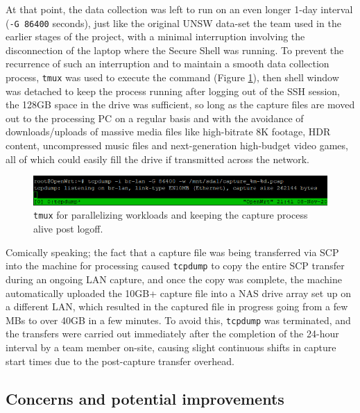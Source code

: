 \documentclass{article}
\begin{document}
At that point, the data collection was left to run on an even longer
1-day interval (\texttt{-G 86400} seconds), just like the original UNSW data-set
the team used in the earlier stages of the project, with a minimal
interruption involving the disconnection of the laptop where the Secure
Shell was running. To prevent the recurrence of such an interruption and
to maintain a smooth data collection process, \texttt{tmux} was used to execute
the command (Figure \ref{fig:tmux}), then shell window was detached to keep the process running after logging out
of the SSH session, the 128GB space in the drive was sufficient, so long
as the capture files are moved out to the processing PC on a regular
basis and with the avoidance of downloads/uploads of massive media files
like high-bitrate 8K footage, HDR content, uncompressed music files and
next-generation high-budget video games, all of which could easily fill
the drive if transmitted across the network.\newline

\begin{figure}[!ht]
    \centering
    \includegraphics[width=15cm]{InputSystem/tmux.png}
    \caption{\texttt{tmux} for parallelizing workloads and keeping the capture process alive post logoff.} 
    \label{fig:tmux}
\end{figure}

Comically speaking; the fact that a capture file was being transferred
via SCP into the machine for processing caused \texttt{tcpdump} to copy the
entire SCP transfer during an ongoing LAN capture, and once the copy was
complete, the machine automatically uploaded the 10GB+ capture file into
a NAS drive array set up on a different LAN, which resulted in the
captured file in progress going from a few MBs to over 40GB in a few
minutes. To avoid this, \texttt{tcpdump} was terminated, and the transfers were
carried out immediately after the completion of the 24-hour interval by
a team member on-site, causing slight continuous shifts in capture start
times due to the post-capture transfer overhead.
\pagebreak
\subsection{Concerns and potential improvements}
\end{document}
